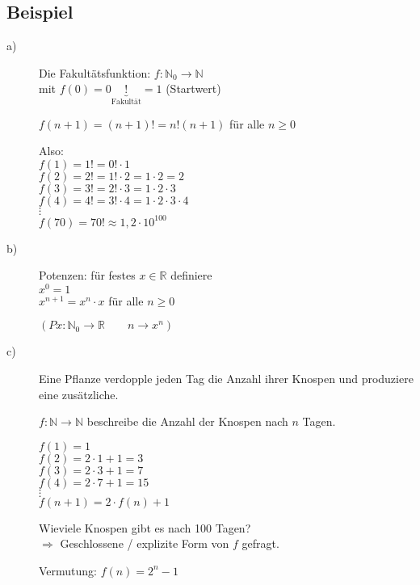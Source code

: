 \documentclass[a4paper, 12pt, twoside] {article}
\begin{document}
\subsection{Beispiel} %
\begin{description}

\item[a)] Die Fakultätsfunktion:
$f \colon \mathbb{N}_0 \rightarrow \mathbb{N}$ \\
mit $f(0) = 0\underbrace{!}_{\text{Fakultät}} = 1$ (Startwert)

$f(n+1) = (n+1)! = n! (n + 1)$ für alle $n \geq 0$

Also: \\
$f(1) = 1! = 0!  \cdot  1$ \\
$f(2) = 2! = 1!  \cdot 2 = 1  \cdot  2 = 2$ \\
$f(3) = 3! = 2! \cdot 3 = 1  \cdot  2  \cdot  3$ \\
$f(4) = 4! = 3! \cdot 4 = 1  \cdot  2  \cdot  3  \cdot  4$ \\
$\vdots$ \\
$f(70) = 70! \approx 1,2 \cdot 10^{100}$

\item[b)] Potenzen: für festes $x \in \mathbb{R}$ definiere \\
$x^0 =1$ \\
$x^{n+1} = x^n  \cdot  x$ für alle $n \geq 0$

$(Px : \mathbb{N}_0 \rightarrow \mathbb{R} \qquad n \rightarrow x^n)$

\item[c)] Eine Pflanze verdopple jeden Tag die Anzahl ihrer Knospen und produziere eine zusätzliche.

$f \colon \mathbb{N} \rightarrow \mathbb{N}$ beschreibe die Anzahl der Knospen nach $n$ Tagen.

$f(1) = 1$ \\
$f(2) = 2 \cdot 1 + 1 = 3$ \\
$f(3) = 2 \cdot 3 + 1 = 7$ \\
$f(4) = 2 \cdot 7+1 = 15$ \\
$\vdots$ \\
$f(n+1) = 2  \cdot  f(n) +1$


Wieviele Knospen gibt es nach 100 Tagen? \\
$\Rightarrow$ Geschlossene / explizite Form von $f$ gefragt.

Vermutung: $f(n) = 2^n - 1$


\end{description}
\end{document}
